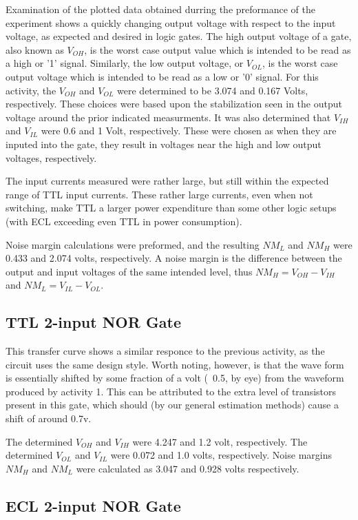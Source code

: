 \documentclass[10pt]{article}
\begin{document}
Examination of the plotted data obtained durring the preformance of the
experiment shows a quickly changing output voltage with respect to the
input voltage, as expected and desired in logic gates. The high output
voltage of a gate, also known as $V_{OH}$, is the worst case output value
which is intended to be read as a high or '1' signal. Similarly, the low
output voltage, or $V_{OL}$, is the worst case output voltage which is
intended to be read as a low or '0' signal. For this activity, the $V_{OH}$ and
$V_{OL}$ were determined to be 3.074 and 0.167 Volts, respectively. These
choices were based upon the stabilization seen in the output voltage
around the prior indicated measurments. It was also determined that
$V_{IH}$ and $V_{IL}$ were 0.6 and 1 Volt, respectively. These were chosen
as when they are inputed into the gate, they result in voltages near the
high and low output voltages, respectively.

The input currents measured were rather large, but still within the
expected range of TTL input currents. These rather large currents, even
when not switching, make TTL a larger power expenditure than some other
logic setups (with ECL exceeding even TTL in power consumption).

Noise margin calculations were preformed, and the resulting $NM_L$ and
$NM_H$ were 0.433 and 2.074 volts, respectively. A noise margin is the
difference between the output and input voltages of the same intended
level, thus $NM_H = V_{OH} - V_{IH}$ and $NM_L = V_{IL} - V_{OL}$.

\subsection{TTL 2-input NOR Gate}

This transfer curve shows a similar responce to the previous activity, as
the circuit uses the same design style. Worth noting, however, is that the
wave form is essentially shifted by some fraction of a volt (~0.5, by eye)
from the waveform produced by activity 1. This can be attributed to the
extra level of transistors present in this gate, which should (by our
general estimation methods) cause a shift of around 0.7v.

The determined $V_{OH}$ and $V_{IH}$ were 4.247 and 1.2 volt, respectively.
The determined $V_{OL}$ and $V_{IL}$ were 0.072 and 1.0 volts,
respectively. Noise margins $NM_H$ and $NM_L$ were calculated as 3.047 and
0.928 volts respectively.

\subsection{ECL 2-input NOR Gate}
\end{document}
